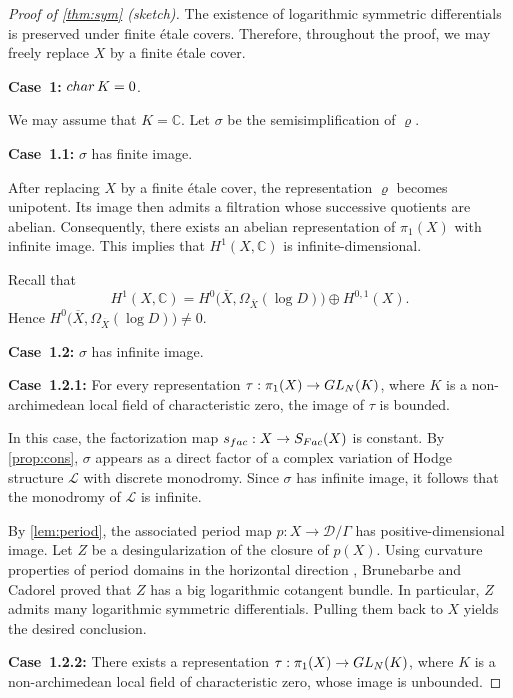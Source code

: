 \documentclass[10pt,a4paper]{amsart}
\newcommand{\GL}{{\rm GL}}
\newcommand{\bC}{\mathbb{C}}
\newcommand{\sD}{\mathscr{D}}
\begin{document}
\begin{proof}[Proof  of \cref{thm:sym} (sketch)]
	The existence of logarithmic symmetric differentials is preserved under finite \'etale covers.
	Therefore, throughout the proof, we may freely replace $X$ by a finite \'etale cover.
	
	\medskip
	\noindent\textbf{Case~1:} ${\rm char}\, K = 0$.
	
	We may assume that $K=\bC$. Let $\sigma$ be the semisimplification of $\varrho$.
	
	\medskip
	\noindent\textbf{Case~1.1:} $\sigma$ has finite image.
	
	After replacing $X$ by a finite \'etale cover, the representation $\varrho$ becomes unipotent.
	Its image then admits a filtration whose successive quotients are abelian. Consequently,
	there exists an abelian representation of $\pi_1(X)$ with infinite image. This implies that
	$H^1(X,\bC)$ is infinite-dimensional.
	
	Recall that
	\[
	H^1(X,\bC)
	= H^0\bigl(\overline{X}, \Omega_{\overline{X}}(\log D)\bigr)
	\oplus H^{0,1}(X).
	\]
	Hence $H^0\bigl(\overline{X}, \Omega_{\overline{X}}(\log D)\bigr)\neq 0$.
	
	\medskip
	\noindent\textbf{Case~1.2:} $\sigma$ has infinite image.
	
	\medskip
	\noindent\textbf{Case~1.2.1:}  
	For every representation $\tau:\pi_1(X)\to \GL_N(K)$, where $K$ is a non-archimedean local
	field of characteristic zero, the image of $\tau$ is bounded.
	
In this case, the factorization map \(s_{\rm fac}: X \to S_{\rm Fac}(X)\) is constant. 
By \cref{prop:cons}, \(\sigma\) appears as a direct factor of a complex variation of Hodge 
structure \(\mathcal{L}\) with discrete monodromy. 
Since \(\sigma\) has infinite image, it follows that the monodromy of \(\mathcal{L}\) is infinite.
	
	By \cref{lem:period}, the associated period map $p:X\to \sD/\Gamma$ has positive-dimensional
	image. Let $Z$ be a desingularization of the closure of $p(X)$. Using curvature properties
	of period domains in the horizontal direction \cite{Gri70}, Brunebarbe and Cadorel
	\cite{BC20} proved that $Z$ has a big logarithmic cotangent bundle. In particular,
	$Z$ admits many logarithmic symmetric differentials. Pulling them back to $X$ yields
	the desired conclusion.
	
	\medskip
	\noindent\textbf{Case~1.2.2:}  
	There exists a representation $\tau:\pi_1(X)\to \GL_N(K)$, where $K$ is a non-archimedean
	local field of characteristic zero, whose image is unbounded.
	

\end{proof}
\end{document}
